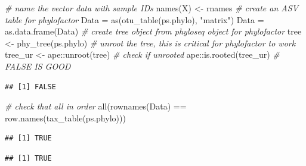 \documentclass[
]{book}
\newenvironment{Shaded}{\begin{snugshade}}{\end{snugshade}}
\newcommand{\CommentTok}[1]{\textcolor[rgb]{0.56,0.35,0.01}{\textit{#1}}}
\newcommand{\FunctionTok}[1]{\textcolor[rgb]{0.00,0.00,0.00}{#1}}
\newcommand{\NormalTok}[1]{#1}
\newcommand{\OtherTok}[1]{\textcolor[rgb]{0.56,0.35,0.01}{#1}}
\newcommand{\SpecialCharTok}[1]{\textcolor[rgb]{0.00,0.00,0.00}{#1}}
\newcommand{\StringTok}[1]{\textcolor[rgb]{0.31,0.60,0.02}{#1}}
\begin{document}
\begin{Shaded}
\begin{Highlighting}[]
\CommentTok{\# name the vector data with sample IDs }
\FunctionTok{names}\NormalTok{(X) }\OtherTok{\textless{}{-}}\NormalTok{ rnames}
\CommentTok{\# create an ASV table for phylofactor }
\NormalTok{Data }\OtherTok{=} \FunctionTok{as}\NormalTok{(}\FunctionTok{otu\_table}\NormalTok{(ps.phylo), }\StringTok{"matrix"}\NormalTok{)}
\NormalTok{Data }\OtherTok{=} \FunctionTok{as.data.frame}\NormalTok{(Data)}
\CommentTok{\# create tree object from phyloseq object for phylofactor}
\NormalTok{tree }\OtherTok{\textless{}{-}} \FunctionTok{phy\_tree}\NormalTok{(ps.phylo) }
\CommentTok{\# unroot the tree, this is critical for phylofactor to work}
\NormalTok{tree\_ur }\OtherTok{\textless{}{-}}\NormalTok{ ape}\SpecialCharTok{::}\FunctionTok{unroot}\NormalTok{(tree)}
\CommentTok{\# check if unrooted}
\NormalTok{ape}\SpecialCharTok{::}\FunctionTok{is.rooted}\NormalTok{(tree\_ur) }\CommentTok{\# FALSE IS GOOD}
\end{Highlighting}
\end{Shaded}

\begin{verbatim}
## [1] FALSE
\end{verbatim}

\begin{Shaded}
\begin{Highlighting}[]
\CommentTok{\# check that all in order}
\FunctionTok{all}\NormalTok{(}\FunctionTok{rownames}\NormalTok{(Data) }\SpecialCharTok{==} \FunctionTok{row.names}\NormalTok{(}\FunctionTok{tax\_table}\NormalTok{(ps.phylo))) }
\end{Highlighting}
\end{Shaded}

\begin{verbatim}
## [1] TRUE
\end{verbatim}

\begin{Shaded}
\end{Shaded}

\begin{verbatim}
## [1] TRUE
\end{verbatim}
\end{document}
